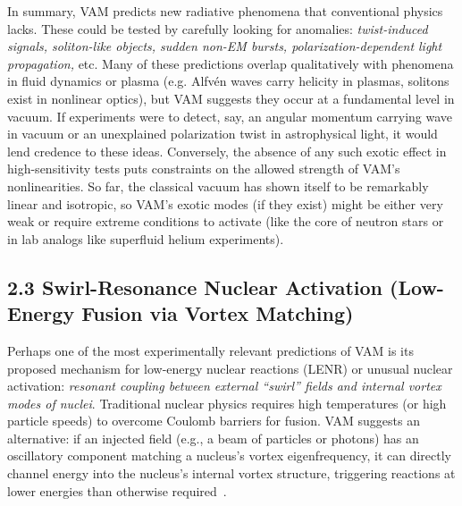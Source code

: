 \documentclass[a4paper,12pt]{article}
\begin{document}
In summary, VAM predicts new radiative phenomena that conventional physics lacks. These could be tested by carefully looking for anomalies: \textit{twist-induced signals, soliton-like objects, sudden non-EM bursts, polarization-dependent light propagation,} etc. Many of these predictions overlap qualitatively with phenomena in fluid dynamics or plasma (e.g. Alfvén waves carry helicity in plasmas, solitons exist in nonlinear optics), but VAM suggests they occur at a fundamental level in vacuum. If experiments were to detect, say, an angular momentum carrying wave in vacuum or an unexplained polarization twist in astrophysical light, it would lend credence to these ideas. Conversely, the absence of any such exotic effect in high-sensitivity tests puts constraints on the allowed strength of VAM’s nonlinearities. So far, the classical vacuum has shown itself to be remarkably linear and isotropic, so VAM’s exotic modes (if they exist) might be either very weak or require extreme conditions to activate (like the core of neutron stars or in lab analogs like superfluid helium experiments).


\subsection*{2.3 Swirl-Resonance Nuclear Activation (Low-Energy Fusion via Vortex Matching)}

Perhaps one of the most experimentally relevant predictions of VAM is its proposed mechanism for low-energy nuclear reactions (LENR) or unusual nuclear activation: \textit{resonant coupling between external ``swirl'' fields and internal vortex modes of nuclei}. Traditional nuclear physics requires high temperatures (or high particle speeds) to overcome Coulomb barriers for fusion. VAM suggests an alternative: if an injected field (e.g., a beam of particles or photons) has an oscillatory component matching a nucleus's vortex eigenfrequency, it can directly channel energy into the nucleus's internal vortex structure, triggering reactions at lower energies than otherwise required~\cite{vamcore}.
\end{document}
